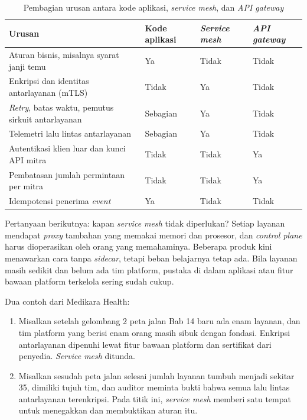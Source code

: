 \begin{table}[!htb]
  \centering
  \caption{Pembagian urusan antara kode aplikasi, \textit{service mesh}, dan \textit{API gateway}}
  \label{tab:ch09-pembagian-urusan}
  \footnotesize
  \begin{tabularx}{\textwidth}{>{\raggedright\arraybackslash}X >{\centering\arraybackslash}p{2.0cm} >{\centering\arraybackslash}p{2.0cm} >{\centering\arraybackslash}p{2.0cm}}
    \hline
    \textbf{Urusan} & \textbf{Kode aplikasi} & \textbf{\textit{Service mesh}} & \textbf{\textit{API
      gateway}} \\ \hline
    Aturan bisnis, misalnya syarat janji temu & Ya & Tidak & Tidak \\ \hline
    Enkripsi dan identitas antarlayanan (mTLS) & Tidak & Ya & Tidak \\ \hline
    \textit{Retry}, batas waktu, pemutus sirkuit antarlayanan & Sebagian & Ya & Tidak \\ \hline
    Telemetri lalu lintas antarlayanan & Sebagian & Ya & Tidak \\ \hline
    Autentikasi klien luar dan kunci API mitra & Tidak & Tidak & Ya \\ \hline
    Pembatasan jumlah permintaan per mitra & Tidak & Tidak & Ya \\ \hline
    Idempotensi penerima \textit{event} & Ya & Tidak & Tidak \\ \hline
  \end{tabularx}
\end{table}

Pertanyaan berikutnya: kapan \textit{service mesh} tidak diperlukan? Setiap layanan mendapat
\textit{proxy} tambahan yang memakai memori dan prosesor, dan \textit{control plane} harus
dioperasikan oleh orang yang memahaminya. Beberapa produk kini menawarkan cara tanpa
\textit{sidecar}, tetapi beban belajarnya tetap ada. Bila layanan masih sedikit dan belum ada tim
platform, pustaka di dalam aplikasi atau fitur bawaan platform terkelola sering sudah cukup.

Dua contoh dari Medikara Health:
\begin{enumerate}
  \item Misalkan setelah gelombang 2 peta jalan Bab 14 baru ada enam layanan, dan tim platform yang
        berisi enam orang masih sibuk dengan fondasi. Enkripsi antarlayanan dipenuhi lewat fitur
        bawaan platform dan sertifikat dari penyedia. \textit{Service mesh} ditunda.
  \item Misalkan sesudah peta jalan selesai jumlah layanan tumbuh menjadi sekitar 35, dimiliki tujuh
        tim, dan auditor meminta bukti bahwa semua lalu lintas antarlayanan terenkripsi. Pada titik ini,
        \textit{service mesh} memberi satu tempat untuk menegakkan dan membuktikan aturan itu.
\end{enumerate}

